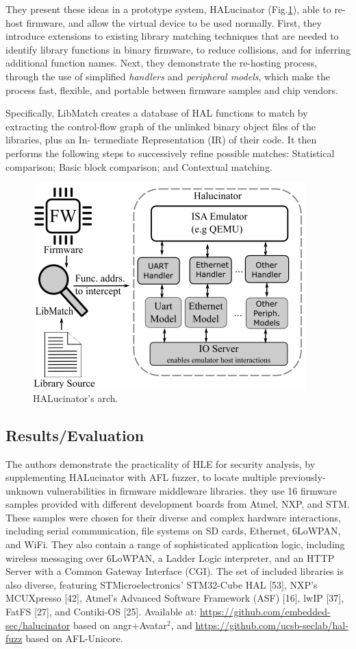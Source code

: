They present these ideas in a prototype system, HALucinator (Fig.\ref{fig:halucinator}), able to re-host firmware, and allow the virtual device to be used normally. First, they introduce extensions to existing library matching techniques that are needed to identify library functions in binary firmware, to reduce collisions, and for inferring additional function names. Next, they demonstrate the re-hosting process, through the use of simplified \emph{handlers} and \emph{peripheral models}, which make the process fast, flexible, and portable between firmware samples and chip vendors.

Specifically,  LibMatch creates a database of HAL functions to match by extracting the control-flow graph of the unlinked binary object files of the libraries, plus an In- termediate Representation (IR) of their code. It then performs the following steps to successively refine possible matches: Statistical comparison; Basic block comparison; and Contextual matching.
\begin{figure}[h]
    \centering
    \includegraphics[width=.8\linewidth]{halucinator.png} %
    \caption{HALucinator's arch.}	
    \label{fig:halucinator}
\end{figure}
\subsection{Results/Evaluation}
The authors demonstrate the practicality of HLE for security analysis, by supplementing HALucinator with AFL fuzzer, to locate multiple previously-unknown vulnerabilities in firmware middleware libraries.  they use 16 firmware samples provided with different development boards from Atmel, NXP, and STM.  These samples were chosen for their diverse and complex hardware interactions, including serial communication, file systems on SD cards, Ethernet, 6LoWPAN, and WiFi.  They also contain a range of sophisticated application logic, including wireless messaging over 6LoWPAN, a Ladder Logic interpreter, and an HTTP Server with a Common Gateway Interface (CGI). The set of included libraries is also diverse, featuring STMicroelectronics’ STM32-Cube HAL [53], NXP’s MCUXpresso [42], Atmel’s Advanced Software Framework (ASF) [16], lwIP [37], FatFS [27], and Contiki-OS [25].
Available at: \url{https://github.com/embedded-sec/halucinator} based on angr+Avatar$^2$, and \url{https://github.com/ucsb-seclab/hal-fuzz} based on AFL-Unicore.
